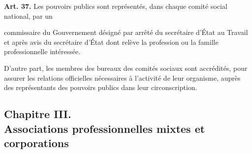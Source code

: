 \documentclass[french,twoside]{book} %
\newcommand{\labelchar}[1]{\textbf{\color{rubric} #1}}
\begin{document}
\noindent \labelchar{Art. 37.} Les pouvoirs publics sont représentés, dans chaque comité social national, par un\par
commissaire du Gouvernement désigné par arrêté du secrétaire d’État au Travail et après avis du secrétaire d’État dont relève la profession ou la famille professionnelle intéressée.\par
D’autre part, les membres des bureaux des comités sociaux sont accrédités, pour assurer les relations officielles nécessaires à l’activité de leur organisme, auprès des représentants des pouvoirs publics dans leur circonscription.

\subsection[{Chapitre III. Associations professionnelles mixtes et corporations}]{Chapitre III. \\
Associations professionnelles mixtes et corporations}
\end{document}
